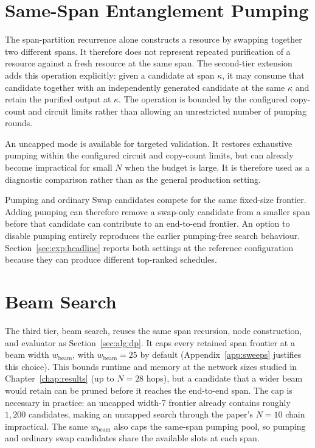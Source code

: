 \section{Same-Span Entanglement Pumping}
\label{sec:alg:pumping}

The span-partition recurrence alone constructs a resource by swapping together two different spans. It therefore does not represent repeated purification of a resource against a fresh resource at the same span. The second-tier extension adds this operation explicitly: given a candidate at span $\kappa$, it may consume that candidate together with an independently generated candidate at the same $\kappa$ and retain the purified output at $\kappa$. The operation is bounded by the configured copy-count and circuit limits rather than allowing an unrestricted number of pumping rounds.

An uncapped mode is available for targeted validation. It restores exhaustive pumping within the configured circuit and copy-count limits, but can already become impractical for small $N$ when the budget is large. It is therefore used as a diagnostic comparison rather than as the general production setting.

Pumping and ordinary Swap candidates compete for the same fixed-size frontier. Adding pumping can therefore remove a swap-only candidate from a smaller span before that candidate can contribute to an end-to-end frontier. An option to disable pumping entirely reproduces the earlier pumping-free search behaviour. Section~\ref{sec:exp:headline} reports both settings at the reference configuration because they can produce different top-ranked schedules.

\section{Beam Search}
\label{sec:alg:beam}

The third tier, beam search, reuses the same span recursion, node construction, and evaluator as Section~\ref{sec:alg:dp}. It caps every retained span frontier at a beam width $w_\text{beam}$, with $w_\text{beam}=25$ by default (Appendix~\ref{app:sweeps} justifies this choice). This bounds runtime and memory at the network sizes studied in Chapter~\ref{chap:results} (up to $N=28$ hops), but a candidate that a wider beam would retain can be pruned before it reaches the end-to-end span. The cap is necessary in practice: an uncapped width-7 frontier already contains roughly $1{,}200$ candidates, making an uncapped search through the paper's $N=10$ chain impractical. The same $w_\text{beam}$ also caps the same-span pumping pool, so pumping and ordinary swap candidates share the available slots at each span.

